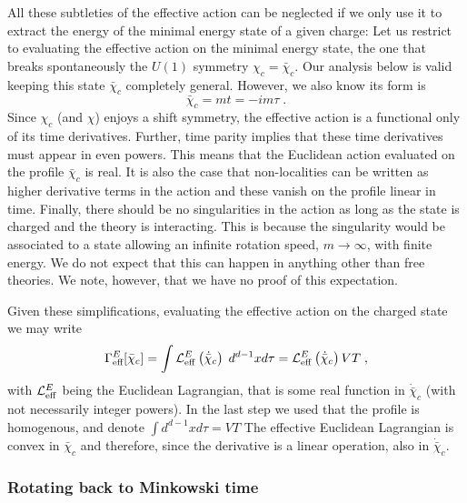\documentclass[11pt]{article}
\numberwithin{equation}{section}
\newcommand{\be}{\begin{equation}} \newcommand{\ee}{\end{equation}}
\begin{document}
All these subtleties of the effective action can be neglected if we only use it to extract the energy of the minimal energy state of a given charge: Let us restrict to evaluating the effective action on the minimal energy state, the one that breaks spontaneously the \(U(1)\) symmetry $\chi_c = \bar \chi_c $. Our analysis below is valid keeping this state $\bar \chi_c$ completely general. However, we also know its form is 
   \be
   \bar{\chi}_c = m t = -i m \tau \;.
   \label{chstacb}
   \ee
Since $\chi_c$ (and $\chi$) enjoys a shift symmetry, the effective action is a functional only of its time derivatives. Further, time parity implies that these time derivatives must appear in even powers. This means that the Euclidean action evaluated on the profile $\bar{\chi}_c$ is real. It is also the case that non-localities can be written as higher derivative terms in the action and these vanish on the profile linear in time. Finally, there should be no singularities in the action as long as the state is charged and the theory is interacting. This is because the singularity would be associated to a state allowing an infinite rotation speed, $m \rightarrow \infty$, with finite energy. We do not expect that this can happen in anything other than free theories. We note, however, that we have no proof of this expectation.

Given these simplifications, evaluating the effective action on the charged state  we may write
\be
\Gamma^E_{\text{eff}}[\bar{\chi}_c] = \int {\cal L}_{\mathrm{eff}}^E\left(\dot{\bar{\chi}}_c\right) \;d^{d-1}xd\tau  = {\cal L}_{\mathrm{eff}}^E\left(\dot{\bar{\chi}}_c\right) VT\;,
\label{efftostate}
\ee 
with ${\cal L}_{\mathrm{eff}}^E$ being the Euclidean Lagrangian, that is some real function in $\dot{\bar{\chi}}_c$ (with not necessarily integer powers). In the last step we used that the profile is homogenous, and denote $\int d^{d-1}x d\tau = VT$
The effective Euclidean Lagrangian is convex in $\bar{\chi}_c$ and therefore, since the derivative is a linear operation, also in $\dot{\bar{\chi}}_c$. 


\subsubsection*{Rotating back to Minkowski time}
\label{sec:backmink}
\end{document}
